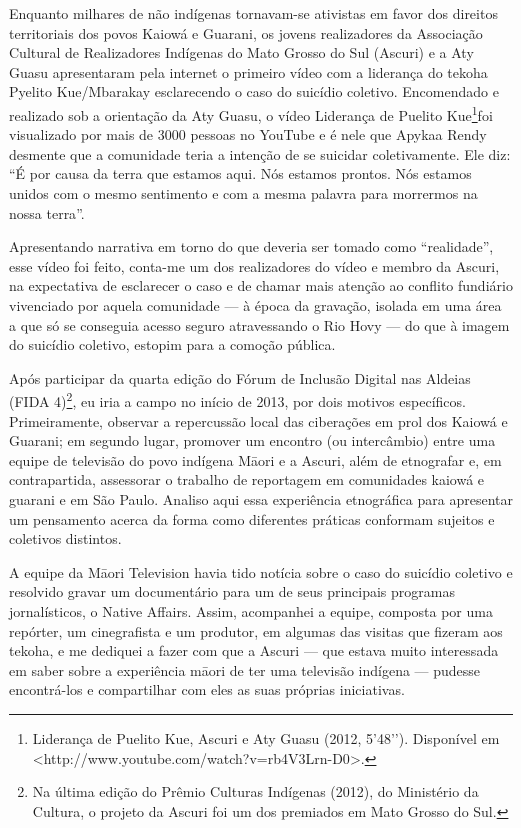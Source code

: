 \documentclass{article}
\begin{document}
Enquanto milhares de n\~ao ind\'igenas tornavam-se ativistas em favor
dos direitos territoriais dos povos Kaiow\'a e Guarani, os jovens
realizadores da Associa\c{c}\~ao Cultural de Realizadores Ind\'igenas
do Mato Grosso do Sul (Ascuri) e a Aty Guasu apresentaram pela internet
o primeiro v\'ideo com a lideran\c{c}a do tekoha Pyelito Kue/Mbarakay
esclarecendo o caso do suic\'idio coletivo. Encomendado e realizado sob
a orienta\c{c}\~ao da Aty Guasu, o v\'ideo Lideran\c{c}a de Puelito
Kue\footnote{ Lideran\c{c}a de Puelito Kue, Ascuri e Aty Guasu (2012,
5{\textquoteright}48{\textquoteright}{\textquoteright}). Dispon\'ivel
em
{\textless}http://www.youtube.com/watch?v=rb4V3Lrn-D0{\textgreater}.}foi
visualizado por mais de 3000 pessoas no YouTube e \'e nele que Apykaa
Rendy desmente que a comunidade teria a inten\c{c}\~ao de se suicidar
coletivamente. Ele diz: {\textquotedblleft}\'E por causa da terra que
estamos aqui. N\'os estamos prontos. N\'os estamos unidos com o mesmo
sentimento e com a mesma palavra para morrermos na nossa
terra{\textquotedblright}.

Apresentando narrativa em torno do que deveria ser tomado como
{\textquotedblleft}realidade{\textquotedblright}, esse v\'ideo foi
feito, conta-me um dos realizadores do v\'ideo e membro da Ascuri, na
expectativa de esclarecer o caso e de chamar mais aten\c{c}\~ao ao
conflito fundi\'ario vivenciado por aquela comunidade --- \`a \'epoca
da grava\c{c}\~ao, isolada em uma \'area a que s\'o se conseguia acesso
seguro atravessando o Rio Hovy --- do que \`a imagem do suic\'idio
coletivo, estopim para a como\c{c}\~ao p\'ublica.

Ap\'os participar da quarta edi\c{c}\~ao do F\'orum de Inclus\~ao
Digital nas Aldeias (FIDA 4)\footnote{ Na \'ultima edi\c{c}\~ao do
Pr\^emio Culturas Ind\'igenas (2012), do Minist\'erio da Cultura, o
projeto da Ascuri foi um dos premiados em Mato Grosso do Sul.}, eu iria
a campo no in\'icio de 2013, por dois motivos espec\'ificos.
Primeiramente, observar a repercuss\~ao local das cibera\c{c}\~oes em
prol dos Kaiow\'a e Guarani; em segundo lugar, promover um encontro (ou
interc\^ambio) entre uma equipe de televis\~ao do povo ind\'igena
M\=aori e a Ascuri, al\'em de etnografar e, em contrapartida,
assessorar o trabalho de reportagem em comunidades kaiow\'a e guarani e
em S\~ao Paulo. Analiso aqui essa experi\^encia etnogr\'afica para
apresentar um pensamento acerca da forma como diferentes pr\'aticas
conformam sujeitos e coletivos distintos.

A equipe da M\=aori Television havia tido not\'icia sobre o caso do
suic\'idio coletivo e resolvido gravar um document\'ario para um de
seus principais programas jornal\'isticos, o Native Affairs. Assim,
acompanhei a equipe, composta por uma rep\'orter, um cinegrafista e um
produtor, em algumas das visitas que fizeram aos tekoha, e me dediquei
a fazer com que a Ascuri --- que estava muito interessada em saber
sobre a experi\^encia m\=aori de ter uma televis\~ao ind\'igena ---
pudesse encontr\'a-los e compartilhar com eles as suas pr\'oprias
iniciativas.
\end{document}
